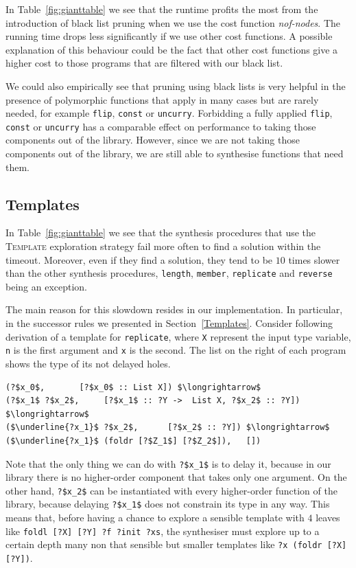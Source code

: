 In Table~\ref{fig:gianttable} we see that the runtime profits the most from the introduction of black list pruning when we use the cost function \textit{nof-nodes}.
The running time drops less significantly if we use other cost functions. A possible explanation of this behaviour could be the fact that other cost functions give a higher cost to those programs that are filtered with our black list.

We could also empirically see that pruning using black lists is very helpful in the presence of polymorphic functions that apply in many cases but are rarely needed, for example \lstinline?flip?, \lstinline?const? or \lstinline?uncurry?. Forbidding a fully applied \lstinline?flip?, \lstinline?const? or \lstinline?uncurry? has a comparable effect on performance to taking those components out of the library. However, since we are not taking those components out of the library, we are still able to synthesise functions that need them.

\subsection{Templates}
In Table~\ref{fig:gianttable} we see that the synthesis procedures that use the \textsc{Template} exploration strategy fail more often to find a solution within the timeout. Moreover, even if they find a solution, they tend to be $10$ times slower than the other synthesis procedures, \lstinline?length?, \lstinline?member?, \lstinline?replicate? and \lstinline?reverse? being an exception.

The main reason for this slowdown resides in our implementation. In particular, in the successor rules we presented in Section~\ref{Templates}. 
Consider following derivation of a template for \lstinline?replicate?, where \lstinline?X? represent the input type variable, \lstinline?n? is the first argument and \lstinline?x? is the second. The list on the right of each program shows the type of its not delayed holes.
\begin{lstlisting}[style=plain]
(?$x_0$,       [?$x_0$ :: List X]) $\longrightarrow$
(?$x_1$ ?$x_2$,     [?$x_1$ :: ?Y ->  List X, ?$x_2$ :: ?Y]) $\longrightarrow$
($\underline{?x_1}$ ?$x_2$,      [?$x_2$ :: ?Y]) $\longrightarrow$
($\underline{?x_1}$ (foldr [?$Z_1$] [?$Z_2$]),   [])
\end{lstlisting}
Note that the only thing we can do with \lstinline!?$x_1$! is to delay it, because in our library there is no higher-order component that takes only one argument. On the other hand, \lstinline!?$x_2$! can be instantiated with every higher-order function of the library, because delaying \lstinline!?$x_1$! does not constrain its type in any way.
This means that, before having a chance to explore a sensible template with $4$ leaves like \lstinline!foldl [?X] [?Y] ?f ?init ?xs!, the synthesiser must explore up to a certain depth many non that sensible but smaller templates like \lstinline!?x (foldr [?X] [?Y])!.

